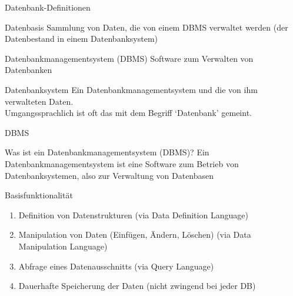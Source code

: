\begin{frame}{Datenbank-Definitionen}
\begin{block}{Datenbasis}
Sammlung von Daten, die von einem DBMS verwaltet werden (der Datenbestand in
einem Datenbanksystem)
\end{block}

\begin{block}{Datenbankmanagementsystem (DBMS)}
Software zum Verwalten von Datenbanken
\end{block}

\begin{block}{Datenbanksystem}
Ein Datenbankmanagementsystem und die von ihm verwalteten Daten. \\
Umgangssprachlich ist oft das mit dem Begriff `Datenbank' gemeint.
\end{block}

\end{frame}


\begin{frame}[allowframebreaks]{DBMS}
\begin{alertblock}{Was ist ein Datenbankmanagementsystem (DBMS)?}
Ein Datenbankmanagementsystem ist eine Software zum Betrieb von
Datenbanksystemen, also zur Verwaltung von Datenbasen
\end{alertblock}

\begin{exampleblock}{Basisfunktionalität}
\begin{enumerate}
    \item Definition von Datenstrukturen (via Data Definition Language)
    \item Manipulation von Daten (Einfügen, Ändern, Löschen) (via Data Manipulation Language)
    \item Abfrage  eines Datenausschnitts (via Query Language)
    \item Dauerhafte Speicherung der Daten (nicht zwingend bei jeder DB)
\end{enumerate}
\end{exampleblock}


\end{frame}


